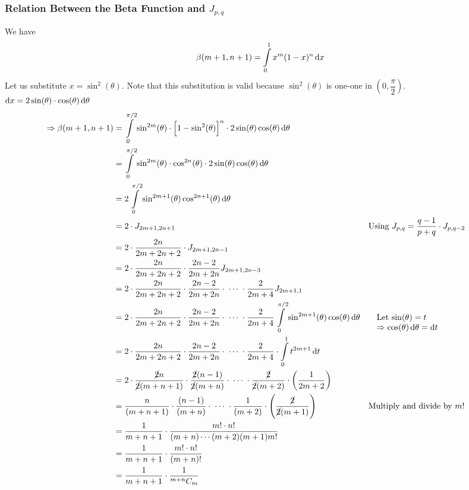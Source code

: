 \documentclass[14]{article}
\theoremstyle{definition}
\theoremstyle{case}
\begin{document}
\subsubsection*{Relation Between the Beta Function and $J_{p, q}$}
We have
\[\beta(m+1, n+1) = \int\limits_0^1 x^m (1-x)^n \dif x\]
Let us substitute $x = \sin^2(\theta)$. Note that this substitution is valid because $\sin^2(\theta)$ is one-one in $\left(0, \dfrac{\pi}{2}\right)$.\\
$\dif x = 2 \sin(\theta) \cdot \cos(\theta) \dif \theta$\
\begin{align*}
\Rightarrow \beta(m+1, n+1) &= \int\limits_0^{\pi/2} \sin^{2m}(\theta) \cdot \left[ 1- \sin^{2}(\theta)\right]^n \cdot 2 \sin(\theta) \cos(\theta) \dif \theta\\
&= \int\limits_0^{\pi/2} \sin^{2m}(\theta) \cdot \cos^{2n}(\theta) \cdot 2 \sin(\theta) \cos(\theta) \dif \theta\\
&= 2 \int\limits_0^{\pi/2} \sin^{2m+1}(\theta) \cos^{2n+1}(\theta) \dif \theta\\
&= 2 \cdot J_{2m+1, 2n+1} && \text{Using } J_{p, q} = \dfrac{q-1}{p+q} \cdot J_{p, q-2}\\
&= 2 \cdot \dfrac{2n}{2m+2n+2} \cdot J_{2m+1, 2n-1}\\
&= 2 \cdot \dfrac{2n}{2m+2n+2} \cdot \dfrac{2n-2}{2m+2n} J_{2m+1, 2n-3}\\
&= 2 \cdot \dfrac{2n}{2m+2n+2} \cdot \dfrac{2n-2}{2m+2n} \cdot \; \cdots \; \cdot \dfrac2{2m+4} J_{2m+1, 1}\\
&= 2 \cdot \dfrac{2n}{2m+2n+2}\cdot \dfrac{2n-2}{2m+2n} \cdot \; \cdots \; \cdot \dfrac2{2m+4} \int\limits_0^{\pi/2}\sin^{2m+1}(\theta) \cos(\theta) \dif \theta && \quad\parbox[t]{3cm}{Let $\sin(\theta) = t\\\Rightarrow \cos(\theta)\dif \theta = \dif t $}\\ 
&= 2 \cdot \dfrac{2n}{2m+2n+2}\cdot \dfrac{2n-2}{2m+2n} \cdot \; \cdots \; \cdot \dfrac2{2m+4} \cdot \int\limits_0^1 t^{2m+1} \dif t\\
&= 2 \cdot \dfrac{\cancel{2}n}{\cancel{2}(m+n+1)}\cdot \dfrac{\cancel{2}(n-1)}{\cancel{2}(m+n)} \cdot \; \cdots \; \cdot \dfrac{\cancel{2}}{\cancel{2}(m+2)} \cdot \left(\dfrac1{2m+2}\right)\\
&= \dfrac{n}{(m+n+1)}\cdot \dfrac{(n-1)}{(m+n)} \cdot \; \cdots \; \cdot \dfrac{1}{(m+2)} \cdot \left(\dfrac{\cancel{2}}{\cancel{2}(m+1)}\right) && \text{Multiply and divide by } m!\\
&= \dfrac1{m+n+1} \cdot \dfrac{m!\cdot n!}{(m+n) \cdots (m+2)(m+1)m!}\\
&= \dfrac1{m+n+1} \cdot \dfrac{m! \cdot n!}{(m+n)!}\\
&= \dfrac1{m+n+1} \cdot \dfrac1{^{m+n}C_m}\\
\end{align*}
\end{document}
